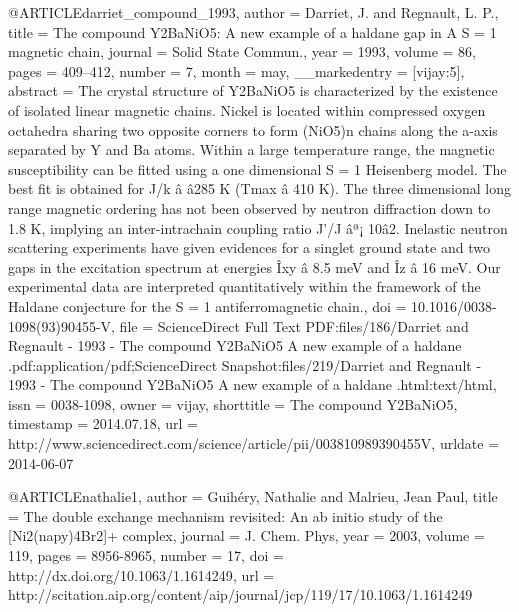 @ARTICLE{darriet_compound_1993,
  author = {Darriet, J. and Regnault, L. P.},
  title = {The compound Y2BaNiO5: A new example of a haldane gap in A S = 1
	magnetic chain},
  journal = {Solid State Commun.},
  year = {1993},
  volume = {86},
  pages = {409--412},
  number = {7},
  month = may,
  __markedentry = {[vijay:5]},
  abstract = {The crystal structure of Y2BaNiO5 is characterized by the existence
	of isolated linear magnetic chains. Nickel is located within compressed
	oxygen octahedra sharing two opposite corners to form ({NiO}5)n chains
	along the a-axis separated by Y and Ba atoms. Within a large temperature
	range, the magnetic susceptibility can be fitted using a one dimensional
	S = 1 Heisenberg model. The best fit is obtained for J/k â â285
	K (Tmax â 410 K). The three dimensional long range magnetic ordering
	has not been observed by neutron diffraction down to 1.8 K, implying
	an inter-intrachain coupling ratio J'/J âª¡ 10â2. Inelastic neutron
	scattering experiments have given evidences for a singlet ground
	state and two gaps in the excitation spectrum at energies Îxy â
	8.5 {meV} and Îz â 16 {meV}. Our experimental data are interpreted
	quantitatively within the framework of the Haldane conjecture for
	the S = 1 antiferromagnetic chain.},
  doi = {10.1016/0038-1098(93)90455-V},
  file = {ScienceDirect Full Text PDF:files/186/Darriet and Regnault - 1993 - The compound Y2BaNiO5 A new example of a haldane .pdf:application/pdf;ScienceDirect Snapshot:files/219/Darriet and Regnault - 1993 - The compound Y2BaNiO5 A new example of a haldane .html:text/html},
  issn = {0038-1098},
  owner = {vijay},
  shorttitle = {The compound Y2BaNiO5},
  timestamp = {2014.07.18},
  url = {http://www.sciencedirect.com/science/article/pii/003810989390455V},
  urldate = {2014-06-07}
}

@ARTICLE{nathalie1,
  author = {Guihéry, Nathalie and Malrieu, Jean Paul},
  title = {The double exchange mechanism revisited: An ab initio study of the
	[Ni2(napy)4Br2]+ complex},
  journal = {J. Chem. Phys},
  year = {2003},
  volume = {119},
  pages = {8956-8965},
  number = {17},
  doi = {http://dx.doi.org/10.1063/1.1614249},
  url = {http://scitation.aip.org/content/aip/journal/jcp/119/17/10.1063/1.1614249}
}


